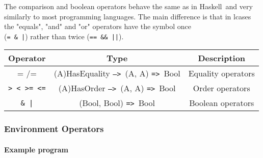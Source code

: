 \documentclass{article}
\def\H{Haskell}
\def\ra{\texttt{=>}\ }
\def\Ra{\texttt{-->}\ }
\begin{document}
The comparison and boolean operators behave the same as in \H\ and very
similarly to most programming languages. The main difference is that in lcases
the "equals", "and" and "or" operators have the symbol once \\(\texttt{= \& |})
rather than twice (\texttt{== \&\& ||}).

\begin{center}
\begin{tabular}{ |c|c|c| } 
\hline
Operator & Type & Description \\ 
\hline
\hline
= /= & (A)HasEquality \Ra (A, A) \ra Bool & Equality operators \\
\hline
\texttt{> < >= <=} & (A)HasOrder \Ra (A, A) \ra Bool & Order operators \\
\hline
\texttt{\& |} & (Bool, Bool) \ra Bool & Boolean operators \\
\hline
\end{tabular}
\end{center}
\subsubsection{Environment Operators}

\paragraph{Example program}
\end{document}
